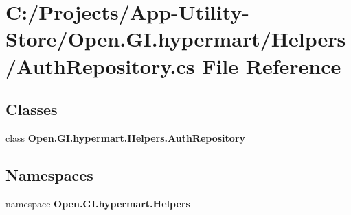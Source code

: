 \section{C\+:/\+Projects/\+App-\/\+Utility-\/\+Store/\+Open.G\+I.\+hypermart/\+Helpers/\+Auth\+Repository.cs File Reference}
\label{_auth_repository_8cs}
\subsection*{Classes}
\begin{DoxyCompactItemize}
\item 
class \textbf{ Open.\+G\+I.\+hypermart.\+Helpers.\+Auth\+Repository}
\end{DoxyCompactItemize}
\subsection*{Namespaces}
\begin{DoxyCompactItemize}
\item 
namespace \textbf{ Open.\+G\+I.\+hypermart.\+Helpers}
\end{DoxyCompactItemize}
